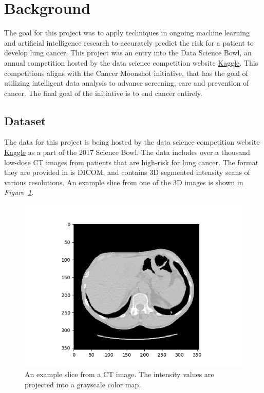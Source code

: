 \documentclass[conference,11pt]{IEEEtran}
\begin{document}
\section{Background}

The goal for this project was to apply techniques in ongoing machine learning and artificial intelligence research to accurately predict the risk for a patient to develop lung cancer. This project was an entry into the Data Science Bowl, an annual competition hosted by the data science competition website  \href{https://www.kaggle.com/c/data-science-bowl-2017}{Kaggle}. This competitions aligns with the Cancer Moonshot initiative, that has the goal of utilizing intelligent data analysis to advance screening, care and prevention of cancer. The final goal of the initiative is to end cancer entirely.

\subsection{Dataset}
The data for this project is being hosted by the data science competition website \href{https://www.kaggle.com/c/data-science-bowl-2017}{Kaggle} as a part of the 2017 Science Bowl. The data includes over a thousand low-dose CT images from patients that are high-risk for lung cancer. The format they are provided in is DICOM, and contains 3D segmented intensity scans of various resolutions. An example slice from one of the 3D images is shown in \textit{Figure~\ref{fig:slice}}.

\begin{figure}[htb]
    \centering
         \includegraphics[width=0.8\linewidth]{figures/plot_slice.png}
	\caption{An example slice from a CT image. The intensity values are projected into a grayscale color map.}
    \label{fig:slice}
\end{figure}
\end{document}

